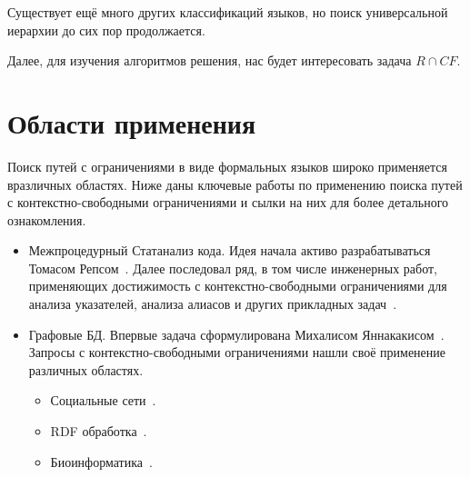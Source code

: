 Существует ещё много других классификаций языков, но поиск универсальной иерархии до сих пор продолжается.

Далее, для изучения алгоритмов решения, нас будет интересовать задача $R \cap CF$.

\section{Области применения}

Поиск путей с ограничениями в виде формальных языков широко применяется вразличных областях. Ниже даны ключевые работы по применению поиска путей с контекстно-свободными ограничениями и сылки на них для более детального ознакомления.

\begin{itemize}
    \item Межпроцедурный Статанализ кода.
    Идея начала активо разрабатываться Томасом Репсом~\cite{Reps}. Далее последовал ряд, в том числе инженерных работ, применяющих достижимость с контекстно-свободными ограничениями для анализа указателей, анализа алиасов и других прикладных задач~\cite{LabelFlowCFLReachability,specificationCFLReachability,Zheng}.
    \item Графовые БД. Впервые задача сформулирована Михалисом Яннакакисом~\cite{Yannakakis}. Запросы с контекстно-свободными ограничениями нашли своё применение различных областях.
    \begin{itemize}
        \item Социальные сети~\cite{Hellings2015PathRF}.
        \item RDF обработка~\cite{10.1007/978-3-319-46523-4_38}.
        \item Биоинформатика~\cite{cfpqBio}.
    \end{itemize}

\end{itemize}



